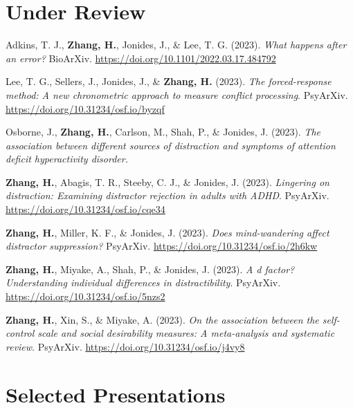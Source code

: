 \documentclass[11pt,a4paper,]{awesome-cv}
\begin{document}
\hypertarget{under-review}{%
\section{Under Review}\label{under-review}}

\hypertarget{bibliography}{}
\leavevmode{}%
Adkins, T. J., \textbf{Zhang, H.}, Jonides, J., \& Lee, T. G. (2023).
\emph{What happens after an error?} BioArXiv.
\url{https://doi.org/10.1101/2022.03.17.484792}

\leavevmode{}%
Lee, T. G., Sellers, J., Jonides, J., \& \textbf{Zhang, H.} (2023).
\emph{The forced-response method: A new chronometric approach to measure
conflict processing}. PsyArXiv.
\url{https://doi.org/10.31234/osf.io/byzqf}

\leavevmode{}%
Osborne, J., \textbf{Zhang, H.}, Carlson, M., Shah, P., \& Jonides, J.
(2023). \emph{The association between different sources of distraction
and symptoms of attention deficit hyperactivity disorder.}

\leavevmode{}%
\textbf{Zhang, H.}, Abagis, T. R., Steeby, C. J., \& Jonides, J. (2023).
\emph{Lingering on distraction: Examining distractor rejection in adults
with ADHD}. PsyArXiv. \url{https://doi.org/10.31234/osf.io/cqe34}

\leavevmode{}%
\textbf{Zhang, H.}, Miller, K. F., \& Jonides, J. (2023). \emph{Does
mind-wandering affect distractor suppression?} PsyArXiv.
\url{https://doi.org/10.31234/osf.io/2h6kw}

\leavevmode{}%
\textbf{Zhang, H.}, Miyake, A., Shah, P., \& Jonides, J. (2023). \emph{A
d factor? Understanding individual differences in distractibility}.
PsyArXiv. \url{https://doi.org/10.31234/osf.io/5nzs2}

\leavevmode{}%
\textbf{Zhang, H.}, Xin, S., \& Miyake, A. (2023). \emph{On the
association between the self-control scale and social desirability
measures: A meta-analysis and systematic review}. PsyArXiv.
\url{https://doi.org/10.31234/osf.io/j4vy8}

\hypertarget{selected-presentations}{%
\section{Selected Presentations}\label{selected-presentations}}
\end{document}
